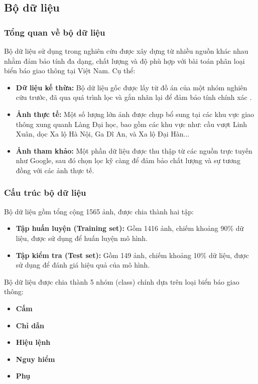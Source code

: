 \documentclass[a4paper,12pt]{article}
\begin{document}
\subsection{Bộ dữ liệu}

\subsubsection{Tổng quan về bộ dữ liệu}
Bộ dữ liệu sử dụng trong nghiên cứu được xây dựng từ nhiều nguồn khác nhau nhằm đảm bảo tính đa dạng, chất lượng và độ phù hợp với bài toán phân loại biển báo giao thông tại Việt Nam. Cụ thể:  
\begin{itemize}
    \item \textbf{Dữ liệu kế thừa:} Bộ dữ liệu gốc được lấy từ đồ án của một nhóm nghiên cứu trước, đã qua quá trình lọc và gắn nhãn lại để đảm bảo tính chính xác \cite{roboflow_vietnam_traffic_signs}. 
    \item \textbf{Ảnh thực tế:} Một số lượng lớn ảnh được chụp bổ sung tại các khu vực giao thông xung quanh Làng Đại học, bao gồm các khu vực như: cầu vượt Linh Xuân, dọc Xa lộ Hà Nội, Ga Dĩ An, và Xa lộ Đại Hàn...
    \item \textbf{Ảnh tham khảo:} Một phần dữ liệu được thu thập từ các nguồn trực tuyến như Google, sau đó chọn lọc kỹ càng để đảm bảo chất lượng và sự tương đồng với các ảnh thực tế.
\end{itemize}

\subsubsection{Cấu trúc bộ dữ liệu}
Bộ dữ liệu gồm tổng cộng 1565 ảnh, được chia thành hai tập:
\begin{itemize}
    \item \textbf{Tập huấn luyện (Training set):} Gồm 1416 ảnh, chiếm khoảng 90\% dữ liệu, được sử dụng để huấn luyện mô hình.
    \item \textbf{Tập kiểm tra (Test set):} Gồm 149 ảnh, chiếm khoảng 10\% dữ liệu, được sử dụng để đánh giá hiệu quả của mô hình.
\end{itemize}

Bộ dữ liệu được chia thành 5 nhóm (class) chính dựa trên loại biển báo giao thông:
\begin{itemize}
    \item \textbf{Cấm}
    \item \textbf{Chỉ dẫn}
    \item \textbf{Hiệu lệnh}
    \item \textbf{Nguy hiểm}
    \item \textbf{Phụ}
\end{itemize}
\end{document}
